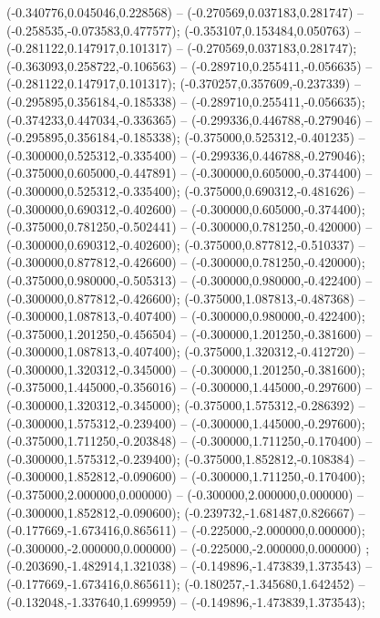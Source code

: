  (-0.340776,0.045046,0.228568) -- (-0.270569,0.037183,0.281747) -- (-0.258535,-0.073583,0.477577);
 (-0.353107,0.153484,0.050763) -- (-0.281122,0.147917,0.101317) -- (-0.270569,0.037183,0.281747);
 (-0.363093,0.258722,-0.106563) -- (-0.289710,0.255411,-0.056635) -- (-0.281122,0.147917,0.101317);
 (-0.370257,0.357609,-0.237339) -- (-0.295895,0.356184,-0.185338) -- (-0.289710,0.255411,-0.056635);
 (-0.374233,0.447034,-0.336365) -- (-0.299336,0.446788,-0.279046) -- (-0.295895,0.356184,-0.185338);
 (-0.375000,0.525312,-0.401235) -- (-0.300000,0.525312,-0.335400) -- (-0.299336,0.446788,-0.279046);
 (-0.375000,0.605000,-0.447891) -- (-0.300000,0.605000,-0.374400) -- (-0.300000,0.525312,-0.335400);
 (-0.375000,0.690312,-0.481626) -- (-0.300000,0.690312,-0.402600) -- (-0.300000,0.605000,-0.374400);
 (-0.375000,0.781250,-0.502441) -- (-0.300000,0.781250,-0.420000) -- (-0.300000,0.690312,-0.402600);
 (-0.375000,0.877812,-0.510337) -- (-0.300000,0.877812,-0.426600) -- (-0.300000,0.781250,-0.420000);
 (-0.375000,0.980000,-0.505313) -- (-0.300000,0.980000,-0.422400) -- (-0.300000,0.877812,-0.426600);
 (-0.375000,1.087813,-0.487368) -- (-0.300000,1.087813,-0.407400) -- (-0.300000,0.980000,-0.422400);
 (-0.375000,1.201250,-0.456504) -- (-0.300000,1.201250,-0.381600) -- (-0.300000,1.087813,-0.407400);
 (-0.375000,1.320312,-0.412720) -- (-0.300000,1.320312,-0.345000) -- (-0.300000,1.201250,-0.381600);
 (-0.375000,1.445000,-0.356016) -- (-0.300000,1.445000,-0.297600) -- (-0.300000,1.320312,-0.345000);
 (-0.375000,1.575312,-0.286392) -- (-0.300000,1.575312,-0.239400) -- (-0.300000,1.445000,-0.297600);
 (-0.375000,1.711250,-0.203848) -- (-0.300000,1.711250,-0.170400) -- (-0.300000,1.575312,-0.239400);
 (-0.375000,1.852812,-0.108384) -- (-0.300000,1.852812,-0.090600) -- (-0.300000,1.711250,-0.170400);
 (-0.375000,2.000000,0.000000) -- (-0.300000,2.000000,0.000000) -- (-0.300000,1.852812,-0.090600);
 (-0.239732,-1.681487,0.826667) -- (-0.177669,-1.673416,0.865611) -- (-0.225000,-2.000000,0.000000);
 (-0.300000,-2.000000,0.000000) -- (-0.225000,-2.000000,0.000000) ;
 (-0.203690,-1.482914,1.321038) -- (-0.149896,-1.473839,1.373543) -- (-0.177669,-1.673416,0.865611);
 (-0.180257,-1.345680,1.642452) -- (-0.132048,-1.337640,1.699959) -- (-0.149896,-1.473839,1.373543);
